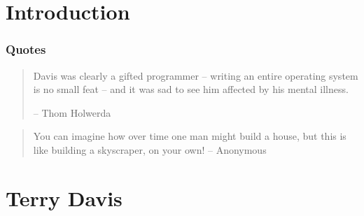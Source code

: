 \documentclass{beamer}
\begin{document}
	\section[Intro]{Introduction}
	\begin{frame}
		\frametitle{Quotes}
		\begin{quote}
			Davis was clearly a gifted programmer – writing an entire operating system
			is no small feat – and it was sad to see him affected by his mental illness.

			\flushright -- Thom Holwerda
		\end{quote}

		\vspace{1em}
		\begin{quote}
			You can imagine how over time one man might build a house, but this is
			like building a skyscraper, on your own! \flushright -- Anonymous
		\end{quote}
	\end{frame}

	\section[T. Davis]{Terry Davis}
\end{document}
